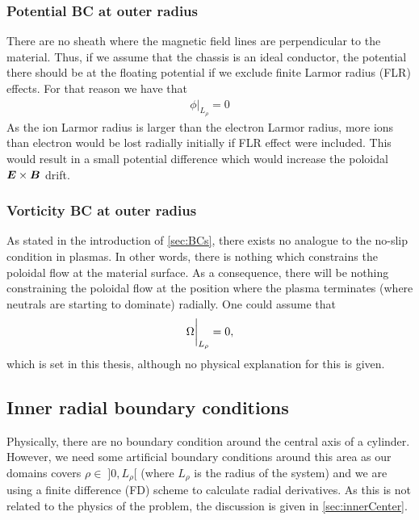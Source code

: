 \subsubsection{Potential BC at outer radius}
%
There are no sheath where the magnetic field lines are perpendicular to the material.
Thus, if we assume that the chassis is an ideal conductor, the potential there should be at the floating potential if we exclude finite Larmor radius (FLR) effects.
For that reason we have that
%
\begin{align*}
    \phi \bigg|_{L_\rho} = 0
\end{align*}
%
As the ion Larmor radius is larger than the electron Larmor radius, more ions than electron would be lost radially initially if FLR effect were included.
This would result in a small potential difference which would increase the poloidal $\boldsymbol{E}\times\boldsymbol{B}$ drift.

\subsubsection{Vorticity BC at outer radius}
%
%
As stated in the introduction of \cref{sec:BCs}, there exists no analogue to the no-slip condition in plasmas.
In other words, there is nothing which constrains the poloidal flow at the material surface.
As a consequence, there will be nothing constraining the poloidal flow at the position where the plasma terminates (where neutrals are starting to dominate) radially.
One could assume that
%
\begin{align*}
    \Omega \bigg|_{L_\rho} = 0,
\end{align*}
%
which is set in this thesis, although no physical explanation for this is given.

\subsection{Inner radial boundary conditions}
\label{sec:BCInnerRho}
%
Physically, there are no boundary condition around the central axis of a cylinder.
However, we need some artificial boundary conditions around this area as our domains covers $\rho \in \; ]0, L_\rho[$ (where $L_\rho$ is the radius of the system) and we are using a finite difference (FD) scheme to calculate radial derivatives.
As this is not related to the physics of the problem, the discussion is given in \cref{sec:innerCenter}.
